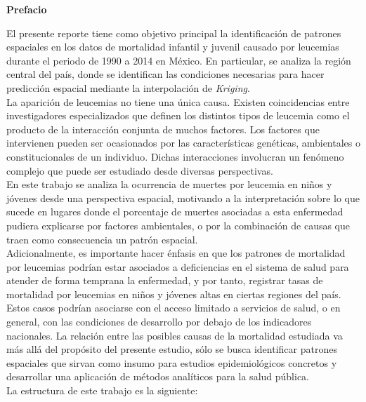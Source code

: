 \documentclass[11pt, oneside]{book}
\begin{document}
{\Large \textbf{Prefacio}}\\

\pagestyle{plain}

\noindent El presente reporte tiene como objetivo principal la identificación de patrones espaciales en los datos de mortalidad infantil y juvenil causado por leucemias durante el periodo de 1990 a 2014 en México. En particular, se analiza la región central del país, donde se identifican las condiciones necesarias para hacer predicción espacial mediante la interpolación de \emph{Kriging}.\\

La aparición de leucemias no tiene una única causa. Existen coincidencias entre investigadores especializados que definen los distintos tipos de leucemia como el producto de la interacción conjunta de muchos factores. Los factores que intervienen pueden ser ocasionados por las características genéticas, ambientales o constitucionales de un individuo. Dichas interacciones involucran un fenómeno complejo que puede ser estudiado desde diversas perspectivas.\\

En este trabajo se analiza la ocurrencia de muertes por leucemia en niños y jóvenes desde una perspectiva espacial, motivando a la interpretación sobre lo que sucede en lugares donde el porcentaje de muertes asociadas a esta enfermedad pudiera explicarse por factores ambientales, o por la combinación de causas que traen como consecuencia un patrón espacial.\\ 

Adicionalmente, es importante hacer énfasis en que los patrones de mortalidad por leucemias podrían estar asociados a deficiencias en el sistema de salud para atender de forma temprana la enfermedad, y por tanto, registrar tasas de mortalidad por leucemias en niños y jóvenes altas en ciertas regiones del país. Estos casos podrían asociarse con el acceso limitado a servicios de salud, o en general, con las condiciones de desarrollo por debajo de los indicadores nacionales. La relación entre las posibles causas de la mortalidad estudiada va más allá del propósito del presente estudio, sólo se busca identificar patrones espaciales que sirvan como insumo para estudios epidemiológicos concretos y desarrollar una aplicación de métodos analíticos para la salud pública.\\

La estructura de este trabajo es la siguiente:\\
\end{document}
